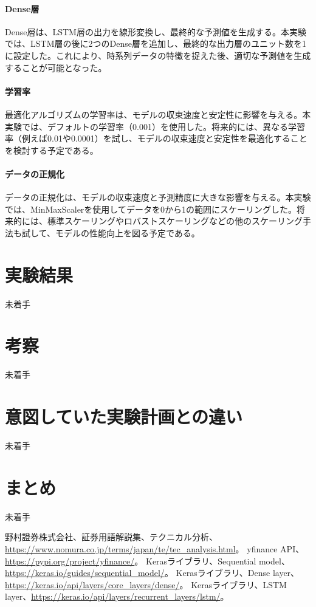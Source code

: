 \documentclass[a4paper, 11pt, titlepage]{jsarticle}
\begin{document}
\paragraph{Dense層}
\indent Dense層は、LSTM層の出力を線形変換し、最終的な予測値を生成する。本実験では、LSTM層の後に2つのDense層を追加し、最終的な出力層のユニット数を1に設定した。これにより、時系列データの特徴を捉えた後、適切な予測値を生成することが可能となった。

\paragraph{学習率}
\indent 最適化アルゴリズムの学習率は、モデルの収束速度と安定性に影響を与える。本実験では、デフォルトの学習率（0.001）を使用した。将来的には、異なる学習率（例えば0.01や0.0001）を試し、モデルの収束速度と安定性を最適化することを検討する予定である。

\paragraph{データの正規化}
\indent データの正規化は、モデルの収束速度と予測精度に大きな影響を与える。本実験では、MinMaxScalerを使用してデータを0から1の範囲にスケーリングした。将来的には、標準スケーリングやロバストスケーリングなどの他のスケーリング手法も試して、モデルの性能向上を図る予定である。

\section{実験結果}
未着手

\section{考察}
未着手

\section{意図していた実験計画との違い}
未着手

\section{まとめ}
未着手

\begin{thebibliography}{99}
   野村證券株式会社、証券用語解説集、テクニカル分析、\url{https://www.nomura.co.jp/terms/japan/te/tec_analysis.html}。
   yfinance API、\url{https://pypi.org/project/yfinance/}。
   Kerasライブラリ、Sequential model、\url{https://keras.io/guides/sequential_model/}。
   Kerasライブラリ、Dense layer、\url{https://keras.io/api/layers/core_layers/dense/}。
   Kerasライブラリ、LSTM layer、\url{https://keras.io/api/layers/recurrent_layers/lstm/}。
  
\end{thebibliography}
\end{document}
